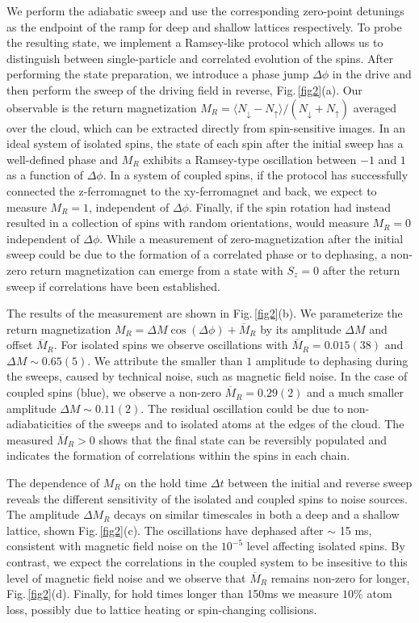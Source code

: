 \documentclass[12pt]{iopart}
\begin{document}
We perform the adiabatic sweep and use the corresponding zero-point detunings as the endpoint of the ramp for deep and shallow lattices respectively. To probe the resulting state, we implement a Ramsey-like protocol which allows us to distinguish between single-particle and correlated evolution of the spins. After performing the state preparation, we introduce a phase jump $\Delta \phi$ in the drive and then perform the sweep of the driving field in reverse, Fig.\,\ref{fig2}(a). Our observable is the return magnetization $M_R = \langle N_{\downarrow}-N_{\uparrow} \rangle/(N_{\downarrow}+N_{\uparrow})$ averaged over the cloud, which can be extracted directly from spin-sensitive images. In an ideal system of isolated spins, the state of each spin after the initial sweep has a well-defined phase and $M_R$ exhibits a Ramsey-type oscillation between $-1$ and $1$ as a function of $\Delta \phi$. In a system of coupled spins, if the protocol has successfully connected the z-ferromagnet to the xy-ferromagnet and back, we expect to measure $M_R = 1$, independent of $\Delta \phi$. Finally, if the spin rotation had instead resulted in a collection of spins with random orientations, would measure $M_R = 0$ independent of $\Delta \phi$. While a measurement of  zero-magnetization after the initial sweep could be due to the formation of a correlated phase or to dephasing, a non-zero return magnetization can emerge from a state with $S_z = 0$ after the return sweep if correlations have been established. 

The results of the measurement are shown in Fig.\,\ref{fig2}(b). We parameterize the return magnetization $M_R = \Delta M \cos(\Delta \phi) + \overline{M}_R$ by its amplitude $\Delta M$ and offset $\overline{M}_R$. For isolated spins we observe oscillations with $\overline{M}_R = 0.015(38)$ and $\Delta M \sim 0.65(5)$. We attribute the smaller than $1$ amplitude to dephasing during the sweeps, caused by technical noise, such as magnetic field noise. In the case of coupled spins (blue), we observe a non-zero $\overline{M}_R = 0.29(2)$ and a much smaller amplitude $\Delta M \sim 0.11(2)$. The residual oscillation could be due to non-adiabaticities of the sweeps and to isolated atoms at the edges of the cloud. The measured $\overline{M}_R > 0$ shows that the final state can be reversibly populated and indicates the formation of correlations within the spins in each chain. 
 
The dependence of $M_R$ on the hold time $\Delta t$ between the initial and reverse sweep reveals the different sensitivity of the isolated and coupled spins to noise sources. The amplitude $\Delta M_R$ decays on similar timescales in both a deep and a shallow lattice, shown Fig.\,\ref{fig2}(c). The oscillations have dephased after $\sim$ 15 ms, consistent with magnetic field noise on the $10^{-5}$ level affecting isolated spins. By contrast, we expect the correlations in the coupled system to be insesitive to this level of magnetic field noise and we observe that $\overline{M}_R$ remains non-zero for longer, Fig.\,\ref{fig2}(d). Finally, for hold times longer than 150ms we measure $10 \%$ atom loss, possibly due to lattice heating or spin-changing collisions.
\end{document}
